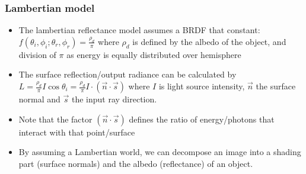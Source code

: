 \subsubsection{Lambertian model}
\begin{itemize}
	\item The lambertian reflectance model assumes a BRDF that constant: $f(\theta_i, \phi_i; \theta_r, \phi_r) = \frac{\rho_d}{\pi}$ where $\rho_d$ is defined by the albedo of the object, and division of $\pi$ as energy is equally distributed over hemisphere
	\item The surface reflection/output radiance can be calculated by $L=\frac{\rho_d}{\pi}I\cos \theta_i=\frac{\rho_d}{\pi}I\cdot (\vec{n}\cdot \vec{s})$ where $I$ is light source intensity, $\vec{n}$ the surface normal and $\vec{s}$ the input ray direction.
	\item Note that the factor $(\vec{n}\cdot \vec{s})$ defines the ratio of energy/photons that interact with that point/surface
	\item By assuming a Lambertian world, we can decompose an image into a shading part (surface normals) and the albedo (reflectance) of an object.
\end{itemize}

